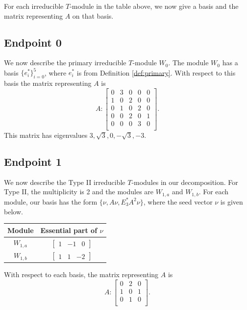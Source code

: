 \documentclass[12pt,letterpaper]{article}
\newcommand{\rowvector}[1]{\begin{bmatrix} #1 \end{bmatrix}}
\begin{document}
For each irreducible $T$-module in the table above, we now give a basis and the matrix representing $A$ on that basis.

\subsection{Endpoint 0}

We now describe the primary irreducible $T$-module $W_0$. The module $W_0$ has a basis $\{e_i^*\}_{i=0}^5$, where $e_i^*$ is from Definition \ref{def:primary}. With respect to this basis the matrix representing $A$ is
\begin{equation}
    A: \begin{bmatrix}
0 & 3 & 0 & 0 & 0 \\
1 & 0 & 2 & 0 & 0 \\
0 & 1 & 0 & 2 & 0 \\
0 & 0 & 2 & 0 & 1 \\
0 & 0 & 0 & 3 & 0 \\
\end{bmatrix}.
\label{eq:pap-I}
\end{equation}
This matrix has eigenvalues $3, \sqrt{3}, 0, -\sqrt{3}, -3$.

\subsection{Endpoint 1}

We now describe the Type II irreducible $T$-modules in our decomposition. For Type II, the multiplicity is 2 and the modules are $W_{1,a}$ and $W_{1,b}$. For each module, our basis has the form $\{\nu, A\nu, E_3^*A^2\nu\}$, where the seed vector $\nu$ is given below.
\begin{center}
    \begin{tabular}{c | c}
    \toprule
       \textbf{Module}  & \textbf {Essential part of }$\nu$ \\
       \midrule
       $W_{1,a}$  & $\rowvector{1 & -1 & 0}$ \\[1.67pt]
       $W_{1,b}$  & $\rowvector{1 & 1 & -2}$ \\
    \bottomrule
    \end{tabular}
\end{center}

With respect to each basis, the matrix representing $A$ is 
\begin{equation}
    A: \begin{bmatrix}
  0 & 2 & 0 \\
  1 & 0 & 1 \\
  0 & 1 & 0 \\
\end{bmatrix}.
\label{eq:pap-II}
\end{equation}
\end{document}
